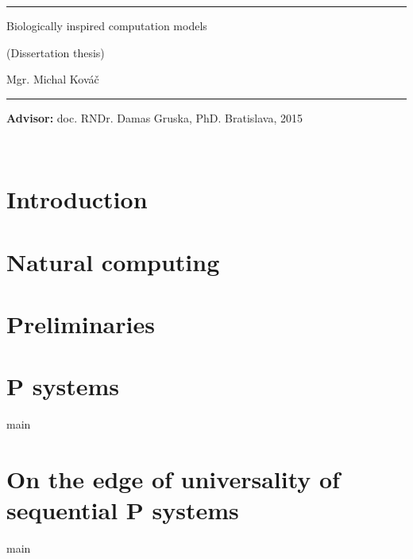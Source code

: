 \documentclass[a4paper,12pt,oneside,openany,pagenumber=footcenter]{book}
\def\mftitlea{Biologically inspired computation models}
\def\mfthesistype{Dissertation thesis}
\def\mfauthor{Mgr. Michal Kováč}
\def\mfadvisor{doc. RNDr. Damas Gruska, PhD.}
\def\mfplacedate{Bratislava, 2015}
\begin{document}
\vfill
\begin{center}
\begin{minipage}{0.8\textwidth}
\hrule
\bigskip\bigskip
\centerline{\LARGE\sc\mftitlea}
\smallskip
\centerline{(\mfthesistype)}
\bigskip
\bigskip
\centerline{\large\sc\mfauthor}
\bigskip\bigskip
\hrule
\end{minipage}
\end{center}
\vfill
{\bf Advisor:} \mfadvisor
\hfill\mfplacedate
\eject
\eject

\thispagestyle{empty}
{~}\vspace{12cm}




\tableofcontents{}
\listoffigures{}

\mainmatter

\chapter*{Introduction} %
\label{cha:introduction}



\chapter{Natural computing} %
\label{cha:natural_computing}



\chapter{Preliminaries} %
\label{cha:preliminaries}



\chapter{P systems} %
\label{cha:p_systems}
{main}


\chapter{On the edge of universality of sequential P systems} %
\label{cha:on_the_edge_of_universality_of_sequential_p_systems}

{main}
\end{document}
